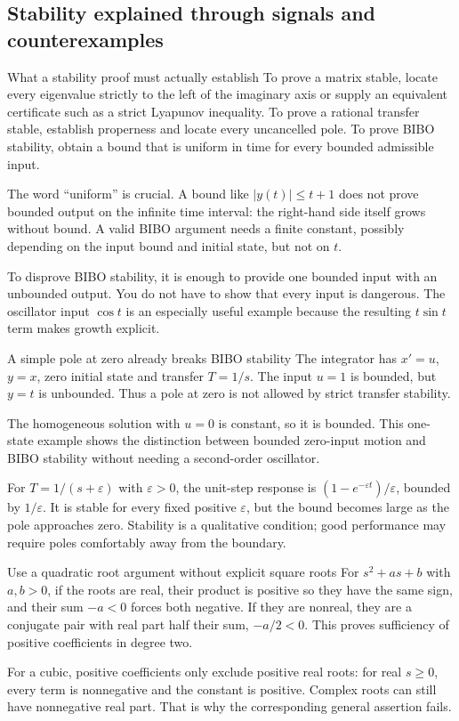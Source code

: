 \subsection{Stability explained through signals and counterexamples}
\begin{concept}{What a stability proof must actually establish}
To prove a matrix stable, locate every eigenvalue strictly to the left of the imaginary axis or supply an equivalent certificate such as a strict Lyapunov inequality. To prove a rational transfer stable, establish properness and locate every uncancelled pole. To prove BIBO stability, obtain a bound that is uniform in time for every bounded admissible input.

The word ``uniform'' is crucial. A bound like $|y(t)|\leq t+1$ does not prove bounded output on the infinite time interval: the right-hand side itself grows without bound. A valid BIBO argument needs a finite constant, possibly depending on the input bound and initial state, but not on $t$.

To disprove BIBO stability, it is enough to provide one bounded input with an unbounded output. You do not have to show that every input is dangerous. The oscillator input $\cos t$ is an especially useful example because the resulting $t\sin t$ term makes growth explicit.
\end{concept}
\begin{worked}{A simple pole at zero already breaks BIBO stability}
The integrator has $x'=u$, $y=x$, zero initial state and transfer $T=1/s$. The input $u=1$ is bounded, but $y=t$ is unbounded. Thus a pole at zero is not allowed by strict transfer stability.

The homogeneous solution with $u=0$ is constant, so it is bounded. This one-state example shows the distinction between bounded zero-input motion and BIBO stability without needing a second-order oscillator.

For $T=1/(s+\varepsilon)$ with $\varepsilon>0$, the unit-step response is $(1-e^{-\varepsilon t})/\varepsilon$, bounded by $1/\varepsilon$. It is stable for every fixed positive $\varepsilon$, but the bound becomes large as the pole approaches zero. Stability is a qualitative condition; good performance may require poles comfortably away from the boundary.
\end{worked}
\begin{method}{Use a quadratic root argument without explicit square roots}
For $s^2+as+b$ with $a,b>0$, if the roots are real, their product is positive so they have the same sign, and their sum $-a<0$ forces both negative. If they are nonreal, they are a conjugate pair with real part half their sum, $-a/2<0$. This proves sufficiency of positive coefficients in degree two.

For a cubic, positive coefficients only exclude positive real roots: for real $s\geq0$, every term is nonnegative and the constant is positive. Complex roots can still have nonnegative real part. That is why the corresponding general assertion fails.
\end{method}
